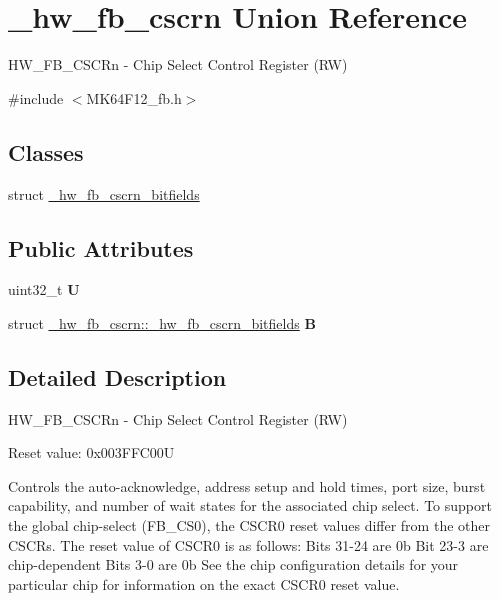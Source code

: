 \hypertarget{union__hw__fb__cscrn}{}\section{\+\_\+hw\+\_\+fb\+\_\+cscrn Union Reference}
\label{union__hw__fb__cscrn}


H\+W\+\_\+\+F\+B\+\_\+\+C\+S\+C\+Rn -\/ Chip Select Control Register (RW)  




{\ttfamily \#include $<$M\+K64\+F12\+\_\+fb.\+h$>$}

\subsection*{Classes}
\begin{DoxyCompactItemize}
\item 
struct \hyperlink{struct__hw__fb__cscrn_1_1__hw__fb__cscrn__bitfields}{\+\_\+hw\+\_\+fb\+\_\+cscrn\+\_\+bitfields}
\end{DoxyCompactItemize}
\subsection*{Public Attributes}
\begin{DoxyCompactItemize}
\item 
uint32\+\_\+t {\bfseries U}\hypertarget{union__hw__fb__cscrn_a020e00bca2e4239dc6dd0b086f07d268}{}\label{union__hw__fb__cscrn_a020e00bca2e4239dc6dd0b086f07d268}

\item 
struct \hyperlink{struct__hw__fb__cscrn_1_1__hw__fb__cscrn__bitfields}{\+\_\+hw\+\_\+fb\+\_\+cscrn\+::\+\_\+hw\+\_\+fb\+\_\+cscrn\+\_\+bitfields} {\bfseries B}\hypertarget{union__hw__fb__cscrn_a32b59759eea186e9cff7b86e5e92a801}{}\label{union__hw__fb__cscrn_a32b59759eea186e9cff7b86e5e92a801}

\end{DoxyCompactItemize}


\subsection{Detailed Description}
H\+W\+\_\+\+F\+B\+\_\+\+C\+S\+C\+Rn -\/ Chip Select Control Register (RW) 

Reset value\+: 0x003\+F\+F\+C00U

Controls the auto-\/acknowledge, address setup and hold times, port size, burst capability, and number of wait states for the associated chip select. To support the global chip-\/select (F\+B\+\_\+\+C\+S0), the C\+S\+C\+R0 reset values differ from the other C\+S\+C\+Rs. The reset value of C\+S\+C\+R0 is as follows\+: Bits 31-\/24 are 0b Bit 23-\/3 are chip-\/dependent Bits 3-\/0 are 0b See the chip configuration details for your particular chip for information on the exact C\+S\+C\+R0 reset value. 

